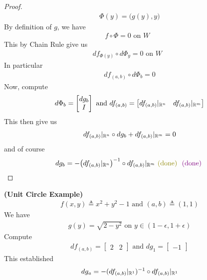 \documentclass{report}
\begin{document}
\begin{proof}
\begin{align*}
\Phi (y)=\Big(g(y),y \Big)
\end{align*}
By definition of $g$, we have 
 \begin{align*}
f\circ \Phi =0 \text{ on $W$ }
\end{align*}
This by Chain Rule give us 
\begin{align*}
df_{\Phi(y)}\circ d\Phi_y=0\text{ on $W$ }
\end{align*}
In particular 
\begin{align*}
df_{(a,b)}\circ d\Phi_b=0
\end{align*}
Now, compute 
\begin{align*}
d\Phi_b= \begin{bmatrix}
  dg_b \\
  I
\end{bmatrix}\text{ and }df_{(a,b)}=\begin{bmatrix}
df_{(a,b)}|_{\mathbb{R}^n} & df_{(a,b)}|_{\mathbb{R}^m}
\end{bmatrix}
\end{align*}
This then give us 
\begin{align*}
df_{(a,b)}|_{\mathbb{R}^n} \circ dg_b+ df_{(a,b)}|_{\mathbb{R}^m}=0
\end{align*}
and of course 
\begin{align*}
dg_b= - \big(df_{(a,b)}|_{\R^n} \big)^{-1} \circ df_{(a,b)}|_{\R^m} \odone \vdone
\end{align*}
\end{proof}
\begin{Example}{\textbf{(Unit Circle Example)}}{}
\begin{align*}
f(x,y)\triangleq x^2+y^2-1 \text{ and }(a,b)\triangleq (1,1)
\end{align*}
We have 
\begin{align*}
g(y)=\sqrt{2-y^2}\text{ on } y \in (1-\epsilon ,1+\epsilon )
\end{align*}
Compute 
\begin{align*}
df_{(a,b)}=\begin{bmatrix}
  2 & 2
\end{bmatrix}\text{ and }dg_1 =\begin{bmatrix}
-1
\end{bmatrix}
\end{align*}
This established 
\begin{align*}
dg_a= -(df_{(a,b)}|_{\mathbb{R}^1})^{-1}\circ df_{(a,b)}|_{\mathbb{R}^1}
\end{align*}
\end{Example}
\end{document}
